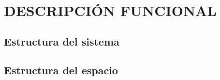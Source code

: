 \chapter{DESCRIPCIÓN FUNCIONAL}
\thispagestyle{empty}

\section{Estructura del sistema}
\section{Estructura del espacio}
